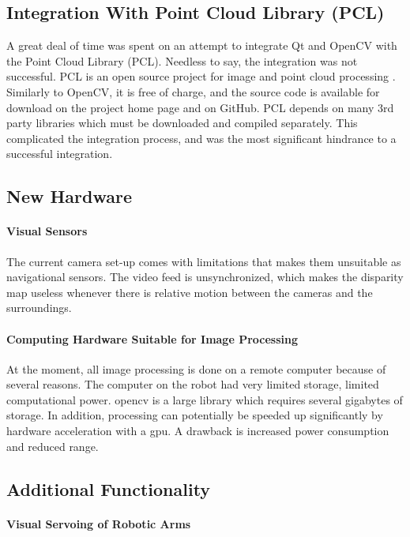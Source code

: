 \subsection{Integration With Point Cloud Library (PCL)}

A great deal of time was spent on an attempt to integrate Qt and OpenCV with the Point Cloud Library (PCL). Needless to say, the integration was not successful. PCL is an open source project for image and point cloud processing \cite{pcl}. Similarly to OpenCV, it is free of charge, and the source code is available for download on the project home page and on GitHub. PCL depends on many 3rd party libraries which must be downloaded and compiled separately. This complicated the integration process, and was the most significant hindrance to a successful integration.



\subsection{New Hardware}

\paragraph{Visual Sensors}

The current camera set-up comes with limitations that makes them unsuitable as navigational sensors. The video feed is unsynchronized, which makes the disparity map useless whenever there is relative motion between the cameras and the surroundings. 

\paragraph{Computing Hardware Suitable for Image Processing} At the moment, all image processing is done on a remote computer because of several reasons. The  computer on the robot had very limited storage, limited computational power. \gls{opencv} is a large library which requires several gigabytes of storage. In addition, processing can potentially be speeded up significantly by hardware acceleration with a \gls{gpu}. A drawback is increased power consumption and reduced range.

\subsection{Additional Functionality}

\paragraph{Visual Servoing of Robotic Arms}

